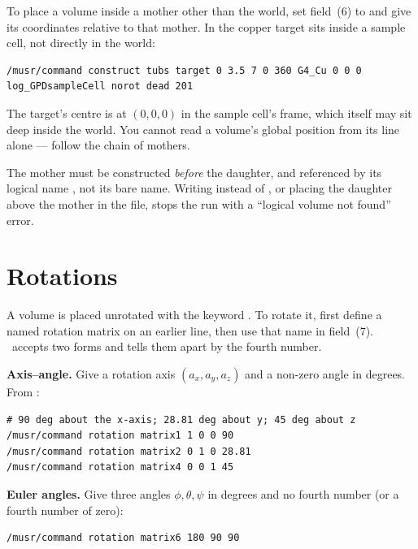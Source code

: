 To place a volume inside a mother other than the world, set field~(6) to  and give its coordinates relative to that mother. In  the copper target sits inside a sample cell, not directly in the world:

\begin{lstlisting}[style=mac,caption={A daughter inside a non-world mother (from \texttt{201.mac})}]
/musr/command construct tubs target 0 3.5 7 0 360 G4_Cu 0 0 0 log_GPDsampleCell norot dead 201
\end{lstlisting}

The target's centre is at \((0,0,0)\) in the sample cell's frame, which itself may sit deep inside the world. You cannot read a volume's global position from its  line alone --- follow the chain of mothers.

\begin{pitfall}
The mother must be constructed \emph{before} the daughter, and referenced by its logical name , not its bare name. Writing  instead of , or placing the daughter above the mother in the file, stops the run with a ``logical volume not found'' error.
\end{pitfall}

\section{Rotations}
\label{sec:rot}
A volume is placed unrotated with the keyword . To rotate it, first define a named rotation matrix on an earlier line, then use that name in field~(7). \musrSim\ accepts two forms and tells them apart by the fourth number.

\textbf{Axis--angle.} Give a rotation axis \((a_x,a_y,a_z)\) and a non-zero angle in degrees. From :

\begin{lstlisting}[style=mac,caption={Axis--angle rotations: axis, then angle}]
# 90 deg about the x-axis; 28.81 deg about y; 45 deg about z
/musr/command rotation matrix1 1 0 0 90
/musr/command rotation matrix2 0 1 0 28.81
/musr/command rotation matrix4 0 0 1 45
\end{lstlisting}

\textbf{Euler angles.} Give three angles \(\phi,\theta,\psi\) in degrees and no fourth number (or a fourth number of zero):

\begin{lstlisting}[style=mac,caption={Euler-angle rotation}]
/musr/command rotation matrix6 180 90 90
\end{lstlisting}

